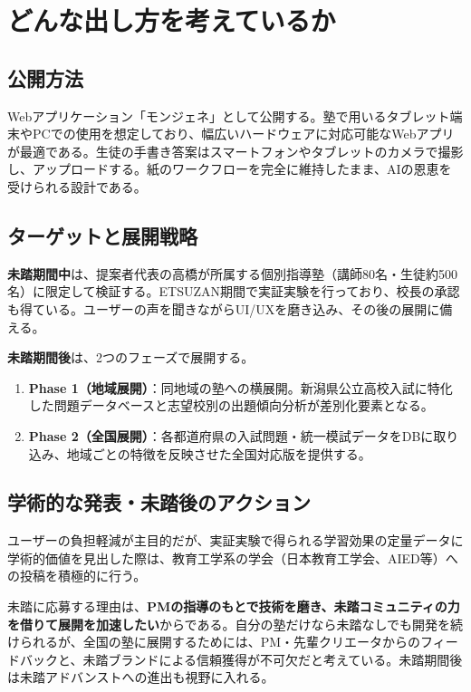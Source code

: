 \documentclass[paper=a4,fontsize=10.5bp,jafontsize=10.5bp]{jlreq}
\begin{document}
\section{どんな出し方を考えているか}

\subsection{公開方法}

Webアプリケーション「モンジェネ」として公開する。塾で用いるタブレット端末やPCでの使用を想定しており、幅広いハードウェアに対応可能なWebアプリが最適である。生徒の手書き答案はスマートフォンやタブレットのカメラで撮影し、アップロードする。紙のワークフローを完全に維持したまま、AIの恩恵を受けられる設計である。

\subsection{ターゲットと展開戦略}

\textbf{未踏期間中}は、提案者代表の高橋が所属する個別指導塾（講師80名・生徒約500名）に限定して検証する。ETSUZAN期間で実証実験を行っており、校長の承認も得ている。ユーザーの声を聞きながらUI/UXを磨き込み、その後の展開に備える。

\textbf{未踏期間後}は、2つのフェーズで展開する。

\begin{enumerate}[leftmargin=2em]
  \item \textbf{Phase 1（地域展開）}：同地域の塾への横展開。新潟県公立高校入試に特化した問題データベースと志望校別の出題傾向分析が差別化要素となる。
  \item \textbf{Phase 2（全国展開）}：各都道府県の入試問題・統一模試データをDBに取り込み、地域ごとの特徴を反映させた全国対応版を提供する。
\end{enumerate}

\subsection{学術的な発表・未踏後のアクション}

ユーザーの負担軽減が主目的だが、実証実験で得られる学習効果の定量データに学術的価値を見出した際は、教育工学系の学会（日本教育工学会、AIED等）への投稿を積極的に行う。

未踏に応募する理由は、\textbf{PMの指導のもとで技術を磨き、未踏コミュニティの力を借りて展開を加速したい}からである。自分の塾だけなら未踏なしでも開発を続けられるが、全国の塾に展開するためには、PM・先輩クリエータからのフィードバックと、未踏ブランドによる信頼獲得が不可欠だと考えている。未踏期間後は未踏アドバンストへの進出も視野に入れる。
\end{document}
